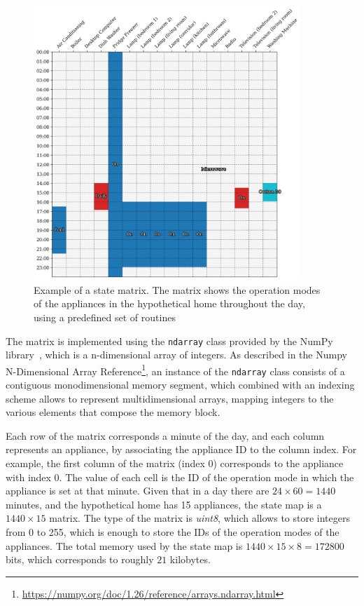 \begin{figure}
    \centering
    \includegraphics[width=0.9\textwidth]{images/real_matrix.png}
    \caption[Example of a state matrix]{Example of a state matrix. The matrix shows the operation modes of the appliances in the hypothetical home throughout the day, using a predefined set of routines}
    \label{fig:state_matrix}
\end{figure}

The matrix is implemented using the \texttt{ndarray} class provided by the NumPy library~\parencite{harrisArrayProgrammingNumPy2020}, which is a n-dimensional array of integers. As described in the Numpy N-Dimensional Array Reference\footnote{\url{https://numpy.org/doc/1.26/reference/arrays.ndarray.html}}, an instance of the \texttt{ndarray} class consists of a contiguous monodimensional memory segment, which combined with an indexing scheme allows to represent multidimensional arrays, mapping integers to the various elements that compose the memory block.

Each row of the matrix corresponds a minute of the day, and each column represents an appliance, by associating the appliance ID to the column index. For example, the first column of the matrix (index $0$) corresponds to the appliance with index 0. The value of each cell is the ID of the operation mode in which the appliance is set at that minute. Given that in a day there are $24 \times 60 = 1440$ minutes, and the hypothetical home has 15 appliances, the state map is a $1440 \times 15$ matrix. The type of the matrix is \textit{uint8}, which allows to store integers from 0 to 255, which is enough to store the IDs of the operation modes of the appliances. The total memory used by the state map is $1440 \times 15 \times 8 = 172800$ bits, which corresponds to roughly $21$ kilobytes.

